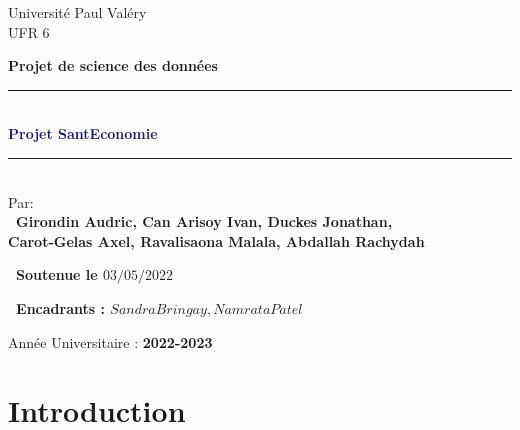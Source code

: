 \documentclass[12pt,a4paper]{report}
\begin{document}
\begin{titlepage}
\begin{center}
\medskip
{\Large{Universit\'{e} Paul Val\'{e}ry }}\\
\textsc{UFR 6}\\
 \vskip0.5cm
  \noindent {\textsc{\LARGE \textcolor{MidnightBlue}{Licence MIASHS}}\\[1cm]}
\end{center}
\vskip0.5cm
\begin{center}
\textbf{Projet de science des donn\'{e}es}\\
\vskip0.5cm
\newcommand{\HRule}{\rule{\linewidth}{0.5mm}} 
	\HRule\\[0.2cm]
	{\huge\bfseries\textcolor{MidnightBlue}{Projet SantEconomie\\[0.2cm]}}
	\HRule\\[1cm]
Par: \\
\small \bf{\ Girondin Audric, Can Arisoy Ivan, Duckes Jonathan, \\ Carot-Gelas Axel, Ravalisaona Malala, Abdallah Rachydah}
\end{center}
  \vspace{3mm}
  \centerline {\small \bf{\ Soutenue le $03/05/2022$}}
  \vspace{3mm}
  \centerline {\small \bf{\ Encadrants : $Sandra Bringay, Namrata Patel$}} 
\vskip2.5cm
\begin{center}
{\small{Année Universitaire : \textbf{2022-2023}}} \\
\end{center}

\end{titlepage}

\vspace{-2cm}
\tableofcontents %
    
\chapter{Introduction}
\vspace{-1.5cm}
\end{document}
